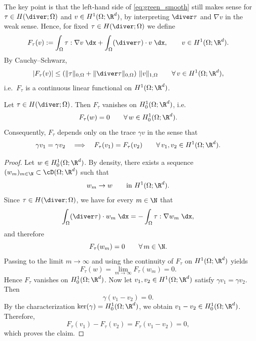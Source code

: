 The key point is that the left-hand side of \eqref{eq:green_smooth} still makes sense for $\tau\in H(\diver;\Omega)$ and $v\in H^1(\Omega;\R^d)$, by interpreting $\diver\tau$ and $\nabla v$ in the weak sense. Hence, for fixed $\tau\in H(\diver;\Omega)$ we define
\begin{equation}\label{eq:Ftau}
	F_\tau(v)
	:=
	\int_\Omega \tau:\nabla v\;\dx + \int_\Omega (\diver\tau)\cdot v\;\dx,
	\qquad v\in H^1(\Omega;\R^d).
\end{equation}
By Cauchy--Schwarz,
\begin{equation*}
	|F_\tau(v)|
	\le
	\left(\|\tau\|_{0,\Omega}+\|\diver\tau\|_{0,\Omega}\right)\,\|v\|_{1,\Omega}
	\qquad\forall\,v\in H^1(\Omega;\R^d),
\end{equation*}
i.e.\ $F_\tau$ is a continuous linear functional on $H^1(\Omega;\R^d)$.

\begin{proposition}\label{pr:Ftau_depends_on_trace}
	Let $\tau\in H(\diver;\Omega)$. Then $F_\tau$ vanishes on $H^1_0(\Omega;\R^d)$, i.e.
	\begin{equation*}
		F_\tau(w)=0
		\qquad\forall\,w\in H^1_0(\Omega;\R^d).
	\end{equation*}
	Consequently, $F_\tau$ depends only on the trace $\gamma v$ in the sense that
	\begin{equation*}
		\gamma v_1=\gamma v_2
		\quad\Longrightarrow\quad
		F_\tau(v_1)=F_\tau(v_2)
		\qquad\forall\,v_1,v_2\in H^1(\Omega;\R^d).
	\end{equation*}
\end{proposition}
\begin{proof}
	Let $w\in H^1_0(\Omega;\R^d)$. By density, there exists a sequence $(w_m)_{m\in\N}\subset \cD(\Omega;\R^d)$ such that
	\begin{equation*}
		w_m\to w
		\qquad\text{in }H^1(\Omega;\R^d).
	\end{equation*}
	Since $\tau\in H(\diver;\Omega)$, we have for every $m\in\N$ that
	\begin{equation*}
		\int_\Omega (\diver\tau)\cdot w_m\;\dx
		=
		-\int_\Omega \tau:\nabla w_m\;\dx,
	\end{equation*}
	and therefore
	\begin{equation*}
		F_\tau(w_m)=0
		\qquad\forall\,m\in\N.
	\end{equation*}
	Passing to the limit $m\to\infty$ and using the continuity of $F_\tau$ on $H^1(\Omega;\R^d)$ yields
	\begin{equation*}
		F_\tau(w)=\lim_{m\to\infty}F_\tau(w_m)=0.
	\end{equation*}
	Hence $F_\tau$ vanishes on $H^1_0(\Omega;\R^d)$. Now let $v_1,v_2\in H^1(\Omega;\R^d)$ satisfy $\gamma v_1=\gamma v_2$. Then
	\begin{equation*}
		\gamma(v_1-v_2)=0.
	\end{equation*}
	By the characterization $\ker(\gamma)=H^1_0(\Omega;\R^d)$, we obtain $v_1-v_2\in H^1_0(\Omega;\R^d)$. Therefore,
	\begin{equation*}
		F_\tau(v_1)-F_\tau(v_2)
		=
		F_\tau(v_1-v_2)
		=
		0,
	\end{equation*}
	which proves the claim.
\end{proof}

